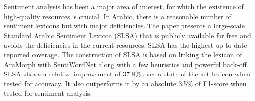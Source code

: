 Sentiment analysis has been a major area of interest, for which the existence of high-quality resources is crucial. In Arabic, there is a reasonable number of sentiment lexicons but with major deficiencies. The paper presents a large-scale Standard Arabic Sentiment Lexicon (SLSA) that is publicly available for free and avoids the deficiencies in the current resources. SLSA has the highest up-to-date reported coverage. The construction of SLSA is based on linking the lexicon of AraMorph with SentiWordNet along with a few heuristics and powerful back-off. SLSA shows a relative improvement of 37.8\% over a state-of-the-art lexicon when tested for accuracy. It also outperforms it by an absolute 3.5\% of F1-score when tested for sentiment analysis.
